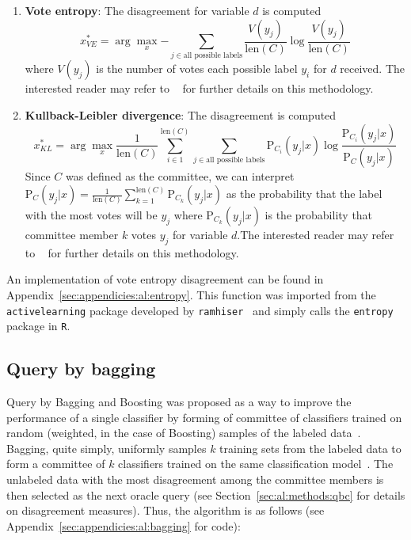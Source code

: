 \tablespacing
\begin{enumerate}
	\item \textbf{Vote entropy}: The disagreement for variable $d$ is computed  
	$$x^*_{VE}=\arg\max_x{-\sum\limits_{j \in \text{all possible labels}} 
	\frac{V(y_j)}{\text{len}(C)} \log \frac{V(y_j)}{\text{len}(C)}}$$
	\noindent where $V(y_j)$ is the number of votes each possible label $y_i$ 
	for $d$ received. The interested reader may refer to ~\cite{dagan1995} 
	for further details on this methodology.
	\item \textbf{Kullback-Leibler divergence}: The disagreement is computed
	$$x^*_{KL}=\arg\max_x{\frac{1}{\text{len}(C)} \sum\limits_{i \in 
	1}^{\text{len}(C)} \sum\limits_{j \in \text{all possible labels}} 
	\text{P}_{C_i}(y_j|x) \log \frac{\text{P}_{C_i}(y_j|x)}
	{\text{P}_{C}(y_j|x)}}$$
	\noindent Since	$C$ was defined as the committee, we can interpret 
	$\text{P}_{C}(y_j|x) = \frac{1}{\text{len}(C)} 
	\sum\limits_{k=1}^{\text{len}(C)} \text{P}_{C_k}(y_j|x)$ as the probability 
	that the label with the most votes will be $y_j$ where 
	$\text{P}_{C_k}(y_j|x)$ is the probability that committee member $k$ votes 
	$y_j$ for variable $d$.The interested reader may refer to 
	~\cite{mccallum1998} for further details on this methodology.
\end{enumerate}
\bodyspacing

\noindent An implementation of vote entropy disagreement can be found in 
Appendix~\ref{sec:appendicies:al:entropy}. This function was imported from the 
\texttt{activelearning} package developed by 
\texttt{ramhiser}~\cite{ramhiser2015} and simply calls the \texttt{entropy} 
package in \texttt{R}.









\subsection{Query by bagging}
\label{sec:al:methods:bagging}

Query by Bagging and Boosting was proposed
as a way to improve the performance of a single classifier by forming of 
committee of classifiers trained on random (weighted, in the case of Boosting) 
samples of the labeled data~\cite{abe1998}. 
Bagging, quite simply, uniformly samples $k$ training sets from the labeled 
data to form a committee of $k$ classifiers trained on the same classification 
model~\cite{abe1998}. The unlabeled data with the most disagreement among the 
committee members is then selected as the next oracle query (see 
Section~\ref{sec:al:methods:qbc} for details on disagreement measures).
Thus, the algorithm is as follows (see 
Appendix~\ref{sec:appendicies:al:bagging} for code):

